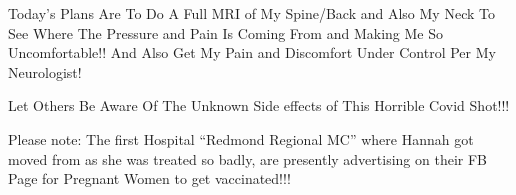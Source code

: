 {Today’s Plans Are To Do A Full MRI of My Spine/Back and Also My Neck To See
Where The Pressure and Pain Is Coming From and Making Me So Uncomfortable!! And
Also Get My Pain and Discomfort Under Control Per My Neurologist!

Let Others Be Aware Of The Unknown Side effects of This Horrible Covid Shot!!!

Please note: The first Hospital “Redmond Regional MC” where Hannah got moved
from as she was treated so badly, are presently advertising on their FB Page for
Pregnant Women to get vaccinated!!!

}
